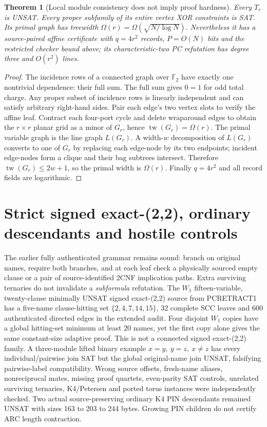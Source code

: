 \documentclass[11pt]{article}
\newtheorem{theorem}{Theorem}
\begin{document}
\begin{theorem}[Local module consistency does not imply proof hardness]
Every \(T_r\) is UNSAT. Every proper subfamily of its entire vertex XOR constraints is SAT. Its primal graph has treewidth \(\Omega(r)=\Omega(\sqrt{N/\log N})\). Nevertheless it has a source-paired affine certificate with \(q=4r^2\) records, \(P=O(N)\) bits and the restricted checker bound above; its characteristic-two PC refutation has degree three and \(O(r^2)\) lines.
\end{theorem}
\begin{proof}
The incidence rows of a connected graph over \(\mathbb F_2\) have exactly one nontrivial dependence: their full sum. The full sum gives \(0=1\) for odd total charge. Any proper subset of incidence rows is linearly independent and can satisfy arbitrary right-hand sides. Pair each edge's two vertex slots to verify the affine leaf.
Contract each four-port cycle and delete wraparound edges to obtain the \(r\times r\) planar grid as a minor of \(G_r\), hence \(\operatorname{tw}(G_r)=\Omega(r)\). The primal variable graph is the line graph \(L(G_r)\). A width-\(w\) decomposition of \(L(G_r)\) converts to one of \(G_r\) by replacing each edge-node by its two endpoints; incident edge-nodes form a clique and their bag subtrees intersect. Therefore \(\operatorname{tw}(G_r)\le 2w+1\), so the primal width is \(\Omega(r)\). Finally \(q=4r^2\) and all record fields are logarithmic.
\end{proof}

\section{Strict signed exact-(2,2), ordinary descendants and hostile controls}
The earlier fully authenticated grammar remains sound: branch on original names, require both branches, and at each leaf check a physically sourced empty clause or a pair of source-identified 2CNF implication paths. Extra surviving ternaries do not invalidate a \emph{subformula} refutation. The \(W_1\) fifteen-variable, twenty-clause minimally UNSAT signed exact-(2,2) source from PCRETRACT1 has a five-name clause-hitting set \(\{2,4,7,14,15\}\), 32 complete SCC leaves and 600 authenticated directed edges in the extended audit. Four disjoint \(W_1\) copies have a global hitting-set minimum at least 20 names, yet the first copy alone gives the same constant-size adaptive proof. This is not a connected signed exact-(2,2) family.
A three-module lifted binary example \(x=y,\ y=z,\ x\ne z\) has every individual/pairwise join SAT but the global original-name join UNSAT, falsifying pairwise-label compatibility. Wrong source offsets, fresh-name aliases, nonreciprocal mates, missing proof quartets, even-parity SAT controls, unrelated surviving ternaries, K4/Petersen and ported torus instances were independently checked. Two actual source-preserving ordinary K4 PIN descendants remained UNSAT with sizes 163 to 203 to 244 bytes. Growing PIN children do not certify ARC length contraction.
\end{document}
